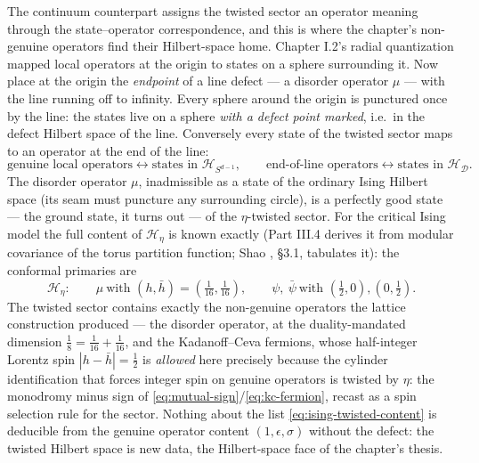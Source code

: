 The continuum counterpart assigns the twisted sector an operator
meaning through the state--operator correspondence, and this is where
the chapter's non-genuine operators find their Hilbert-space home.
Chapter I.2's radial quantization mapped local operators at the origin
to states on a sphere surrounding it. Now place at the origin the
\emph{endpoint} of a line defect --- a disorder operator $\mu$ --- with
the line running off to infinity. Every sphere around the origin is
punctured once by the line: the states live on a sphere \emph{with a
defect point marked}, i.e.\ in the defect Hilbert space of the line.
Conversely every state of the twisted sector maps to an operator at
the end of the line:
\begin{equation}
\text{genuine local operators} \leftrightarrow \text{states in }
\mathcal H_{S^{d-1}},
\qquad
\text{end-of-line operators} \leftrightarrow \text{states in }
\mathcal H_{\mathcal D} .
\label{eq:twisted-state-operator}
\end{equation}
The disorder operator $\mu$, inadmissible as a state of the ordinary
Ising Hilbert space (its seam must puncture any surrounding circle), is
a perfectly good state --- the ground state, it turns out --- of the
$\eta$-twisted sector. For the critical Ising model the full content
of $\mathcal H_\eta$ is known exactly (Part III.4 derives it from
modular covariance of the torus partition function; Shao
, \S3.1, tabulates it): the conformal primaries are
\begin{equation}
\mathcal H_\eta:\qquad
\mu \ \text{with } (h, \bar h) = \left(\tfrac1{16}, \tfrac1{16}\right),
\qquad
\psi,\ \bar\psi \ \text{with } \left(\tfrac12, 0\right),
\left(0, \tfrac12\right) .
\label{eq:ising-twisted-content}
\end{equation}
The twisted sector contains exactly the non-genuine operators the
lattice construction produced --- the disorder operator, at the
duality-mandated dimension $\frac18 = \frac1{16} + \frac1{16}$, and the
Kadanoff--Ceva fermions, whose half-integer Lorentz spin $|h - \bar h|
= \frac12$ is \emph{allowed} here precisely because the cylinder
identification that forces integer spin on genuine operators is
twisted by $\eta$: the monodromy minus sign of
\eqref{eq:mutual-sign}/\eqref{eq:kc-fermion}, recast as a spin
selection rule for the sector. Nothing about the list
\eqref{eq:ising-twisted-content} is deducible from the genuine
operator content $(1, \epsilon, \sigma)$ without the defect: the
twisted Hilbert space is new data, the Hilbert-space face of the
chapter's thesis.

